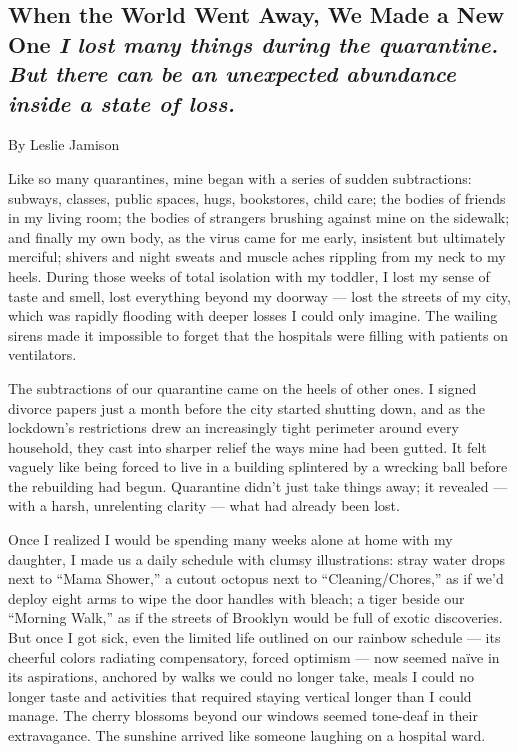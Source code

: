 \hypertarget{when-the-world-went-away-we-made-a-new-one-i-lost-many-things-during-the-quarantine-but-there-can-be-an-unexpected-abundance-inside-a-state-of-loss}{%
\subsection{\texorpdfstring{When the World Went Away, We Made a New One
\emph{I lost many things during the quarantine. But there can be an
unexpected abundance inside a state of
loss.}}{When the World Went Away, We Made a New One I lost many things during the quarantine. But there can be an unexpected abundance inside a state of loss.}}\label{when-the-world-went-away-we-made-a-new-one-i-lost-many-things-during-the-quarantine-but-there-can-be-an-unexpected-abundance-inside-a-state-of-loss}}

By Leslie Jamison

Like so many quarantines, mine began with a series of sudden
subtractions: subways, classes, public spaces, hugs, bookstores, child
care; the bodies of friends in my living room; the bodies of strangers
brushing against mine on the sidewalk; and finally my own body, as the
virus came for me early, insistent but ultimately merciful; shivers and
night sweats and muscle aches rippling from my neck to my heels. During
those weeks of total isolation with my toddler, I lost my sense of taste
and smell, lost everything beyond my doorway --- lost the streets of my
city, which was rapidly flooding with deeper losses I could only
imagine. The wailing sirens made it impossible to forget that the
hospitals were filling with patients on ventilators.

The subtractions of our quarantine came on the heels of other ones. I
signed divorce papers just a month before the city started shutting
down, and as the lockdown's restrictions drew an increasingly tight
perimeter around every household, they cast into sharper relief the ways
mine had been gutted. It felt vaguely like being forced to live in a
building splintered by a wrecking ball before the rebuilding had begun.
Quarantine didn't just take things away; it revealed --- with a harsh,
unrelenting clarity --- what had already been lost.

Once I realized I would be spending many weeks alone at home with my
daughter, I made us a daily schedule with clumsy illustrations: stray
water drops next to ``Mama Shower,'' a cutout octopus next to
``Cleaning/Chores,'' as if we'd deploy eight arms to wipe the door
handles with bleach; a tiger beside our ``Morning Walk,'' as if the
streets of Brooklyn would be full of exotic discoveries. But once I got
sick, even the limited life outlined on our rainbow schedule --- its
cheerful colors radiating compensatory, forced optimism --- now seemed
naïve in its aspirations, anchored by walks we could no longer take,
meals I could no longer taste and activities that required staying
vertical longer than I could manage. The cherry blossoms beyond our
windows seemed tone-deaf in their extravagance. The sunshine arrived
like someone laughing on a hospital ward.

